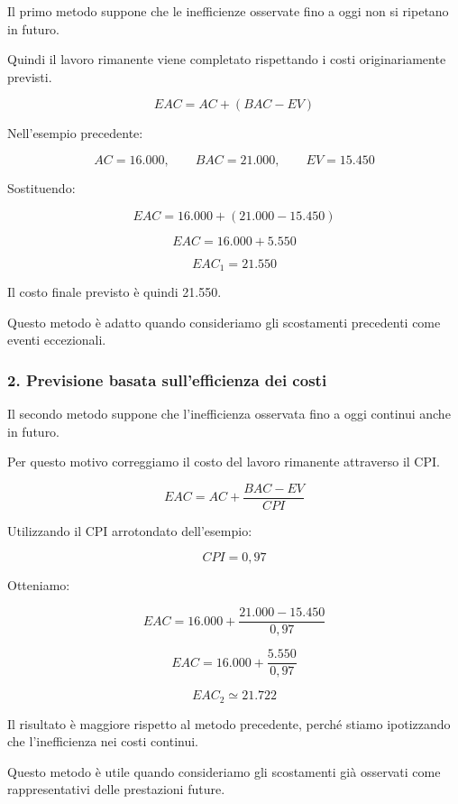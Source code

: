 \noindent Il primo metodo suppone
che le inefficienze osservate fino a oggi
non si ripetano in futuro.

\medskip

\noindent Quindi il lavoro rimanente
viene completato rispettando
i costi originariamente previsti.

\[
\boxed{
EAC=AC+(BAC-EV)
}
\]

\noindent Nell'esempio precedente:

\[
AC=16.000,\qquad
BAC=21.000,\qquad
EV=15.450
\]

\noindent Sostituendo:

\[
EAC=16.000+(21.000-15.450)
\]

\[
EAC=16.000+5.550
\]

\[
\boxed{EAC_1=21.550}
\]

\noindent Il costo finale previsto
è quindi 21.550.

\medskip

\noindent Questo metodo è adatto
quando consideriamo gli scostamenti
precedenti come eventi eccezionali.


\subsubsection*{2. Previsione basata sull'efficienza dei costi}

\noindent Il secondo metodo suppone
che l'inefficienza osservata fino a oggi
continui anche in futuro.

\medskip

\noindent Per questo motivo correggiamo
il costo del lavoro rimanente
attraverso il CPI.

\[
\boxed{
EAC=AC+\frac{BAC-EV}{CPI}
}
\]

\noindent Utilizzando il CPI arrotondato
dell'esempio:

\[
CPI=0{,}97
\]

\noindent Otteniamo:

\[
EAC=16.000+\frac{21.000-15.450}{0{,}97}
\]

\[
EAC=16.000+\frac{5.550}{0{,}97}
\]

\[
\boxed{EAC_2\simeq21.722}
\]

\noindent Il risultato è maggiore
rispetto al metodo precedente,
perché stiamo ipotizzando
che l'inefficienza nei costi continui.

\medskip

\noindent Questo metodo è utile
quando consideriamo gli scostamenti
già osservati come rappresentativi
delle prestazioni future.


